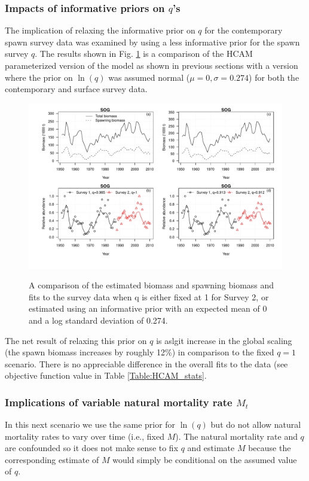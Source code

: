 		\subsubsection{Impacts of informative priors on $q$'s}
The implication of relaxing the informative prior on $q$ for the contemporary spawn survey data was examined by using a less informative prior for the spawn survey $q$. The results shown in Fig. \ref{fig:qFix_qPrior} is a comparison of the HCAM parameterized version of the model as shown in previous sections with a version where the prior on $\ln(q)$ was assumed normal ($\mu=0, \sigma = 0.274$) for both the contemporary and surface survey data.
\begin{figure}[!tbp]
	\includegraphics[width=\textwidth]{../FIGS/iscam_fig_HCAM_qFix_qPrior.pdf}\\
	\caption{A comparison of the estimated biomass and spawning biomass and fits to the survey data when q is either fixed at 1 for Survey 2, or  estimated using an informative prior with an expected mean of 0 and a log standard deviation of 0.274.}\label{fig:qFix_qPrior}
\end{figure}

The net result of relaxing this prior on $q$ is aslgit increase in the global scaling (the spawn biomass increases by roughly 12\%) in comparison to the fixed $q=1$ scenario.  There is no appreciable difference in the overall fits to the data (see objective function value in Table \ref{Table:HCAM_stats}.
		
		\subsubsection{Implications of variable natural mortality rate $M_t$}
	In this next scenario we use the same prior for $\ln(q)$ but do not allow natural mortality rates to vary over time (i.e., fixed $M$).  The natural mortality rate and $q$ are confounded so it does not make sense to fix $q$ and estimate $M$ because the corresponding estimate of $M$ would simply be conditional on the assumed value of $q$.
	
